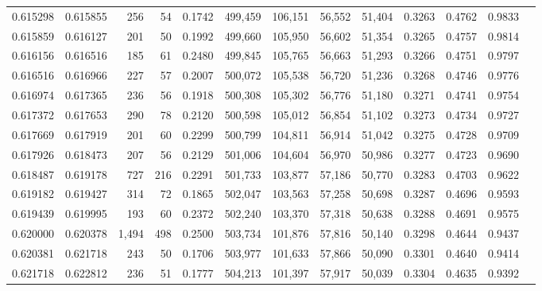 \begin{tabular}{rrrrrrrrrrrrr}
0.615298 & 0.615855 &   256 &  54 &                                     0.1742 & 499,459 & 106,151 &  56,552 &  51,404 & 0.3263 & 0.4762 & 0.9833 \\
0.615859 & 0.616127 &   201 &  50 &                                     0.1992 & 499,660 & 105,950 &  56,602 &  51,354 & 0.3265 & 0.4757 & 0.9814 \\
0.616156 & 0.616516 &   185 &  61 &                                     0.2480 & 499,845 & 105,765 &  56,663 &  51,293 & 0.3266 & 0.4751 & 0.9797 \\
0.616516 & 0.616966 &   227 &  57 &                                     0.2007 & 500,072 & 105,538 &  56,720 &  51,236 & 0.3268 & 0.4746 & 0.9776 \\
0.616974 & 0.617365 &   236 &  56 &                                     0.1918 & 500,308 & 105,302 &  56,776 &  51,180 & 0.3271 & 0.4741 & 0.9754 \\
0.617372 & 0.617653 &   290 &  78 &                                     0.2120 & 500,598 & 105,012 &  56,854 &  51,102 & 0.3273 & 0.4734 & 0.9727 \\
0.617669 & 0.617919 &   201 &  60 &                                     0.2299 & 500,799 & 104,811 &  56,914 &  51,042 & 0.3275 & 0.4728 & 0.9709 \\
0.617926 & 0.618473 &   207 &  56 &                                     0.2129 & 501,006 & 104,604 &  56,970 &  50,986 & 0.3277 & 0.4723 & 0.9690 \\
0.618487 & 0.619178 &   727 & 216 &                                     0.2291 & 501,733 & 103,877 &  57,186 &  50,770 & 0.3283 & 0.4703 & 0.9622 \\
0.619182 & 0.619427 &   314 &  72 &                                     0.1865 & 502,047 & 103,563 &  57,258 &  50,698 & 0.3287 & 0.4696 & 0.9593 \\
0.619439 & 0.619995 &   193 &  60 &                                     0.2372 & 502,240 & 103,370 &  57,318 &  50,638 & 0.3288 & 0.4691 & 0.9575 \\
0.620000 & 0.620378 & 1,494 & 498 &                                     0.2500 & 503,734 & 101,876 &  57,816 &  50,140 & 0.3298 & 0.4644 & 0.9437 \\
0.620381 & 0.621718 &   243 &  50 &                                     0.1706 & 503,977 & 101,633 &  57,866 &  50,090 & 0.3301 & 0.4640 & 0.9414 \\
0.621718 & 0.622812 &   236 &  51 &                                     0.1777 & 504,213 & 101,397 &  57,917 &  50,039 & 0.3304 & 0.4635 & 0.9392 \\

\end{tabular}

